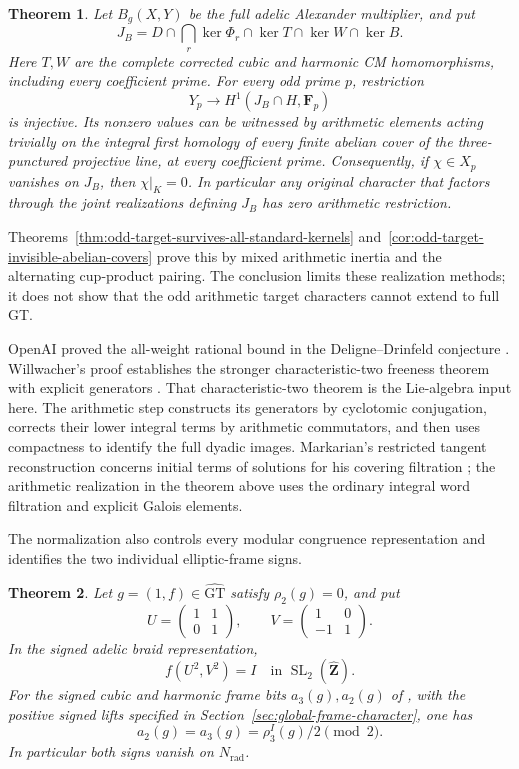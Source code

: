 \documentclass[11pt,a4paper]{article}
\newtheorem{theorem}{Theorem}[section]
\theoremstyle{definition}
\theoremstyle{remark}
\newcommand{\GT}{\widehat{\mathrm{GT}}}
\newcommand{\Zh}{\widehat{\mathbf Z}}
\newcommand{\F}{\mathbf F}
\begin{document}
\begin{theorem}\label{thm:main-odd-realization-obstruction}
Let \(B_g(X,Y)\) be the full adelic Alexander multiplier, and put
\[
 J_B=D\cap\bigcap_r\ker\Phi_r\cap\ker T\cap\ker W\cap\ker B.
\]
Here \(T,W\) are the complete corrected cubic and harmonic CM
homomorphisms, including every coefficient prime. For every odd
prime \(p\), restriction
\[
             Y_p\longrightarrow H^1(J_B\cap H,\F_p)
\]
is injective. Its nonzero values can be witnessed by arithmetic
elements acting trivially on the integral first homology of every
finite abelian cover of the three-punctured projective line, at
every coefficient prime.
Consequently, if \(\chi\in X_p\) vanishes on \(J_B\), then
\(\chi|_K=0\). In particular any original character that factors
through the joint realizations defining \(J_B\) has zero arithmetic
restriction.
\end{theorem}

Theorems~\ref{thm:odd-target-survives-all-standard-kernels}
and~\ref{cor:odd-target-invisible-abelian-covers} prove this by
mixed arithmetic inertia and the alternating cup-product pairing.
The conclusion limits these realization methods; it does not show
that the odd arithmetic target characters cannot extend to full GT.

OpenAI proved the all-weight rational bound in the
Deligne--Drinfeld conjecture \cite[Theorem~1.1]{OpenAI}.
Willwacher's proof establishes the stronger characteristic-two
freeness theorem with explicit generators
\cite[Theorems~1.1 and~1.3, p.~2; \S4.3, p.~9]{Willwacher}.
That characteristic-two theorem is the Lie-algebra input here.
The arithmetic step constructs its generators by cyclotomic
conjugation, corrects their lower integral terms by arithmetic
commutators, and then uses compactness to identify the full dyadic
images. Markarian's restricted tangent reconstruction concerns
initial terms of solutions for his covering filtration
\cite[Theorem~4.8 and \S5, p.~10]{Markarian}; the arithmetic
realization in the theorem above uses the ordinary integral word
filtration and explicit Galois elements.

The normalization also controls every modular congruence representation
and identifies the two individual elliptic-frame signs.

\begin{theorem}\label{thm:main-congruence-frames}
Let $g=(1,f)\in\GT$ satisfy $\rho_2(g)=0$, and put
\[
 U=\begin{pmatrix}1&1\\0&1\end{pmatrix},\qquad
 V=\begin{pmatrix}1&0\\-1&1\end{pmatrix}.
\]
In the signed adelic braid representation,
\[
 f(U^2,V^2)=I\quad\text{in }\operatorname{SL}_2(\Zh).
\]
For the signed cubic and harmonic frame bits $a_3(g),a_2(g)$
of \cite[Lemmas 12--15]{H17}, with the positive signed lifts
specified in Section~\ref{sec:global-frame-character}, one has
\[
 a_2(g)=a_3(g)=\rho_3^I(g)/2\pmod2.
\]
In particular both signs vanish on $N_{\mathrm{rad}}$.
\end{theorem}
\end{document}
